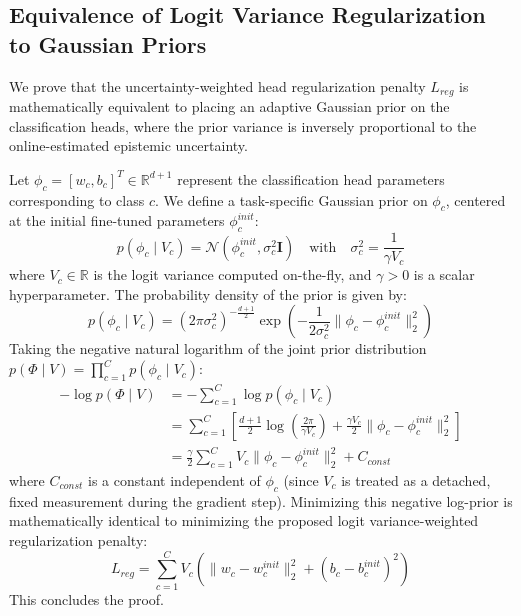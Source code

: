 \documentclass{article}
\theoremstyle{plain}
\theoremstyle{definition}
\theoremstyle{remark}
\begin{document}
\subsection{Equivalence of Logit Variance Regularization to Gaussian Priors}
We prove that the uncertainty-weighted head regularization penalty $L_{reg}$ is mathematically equivalent to placing an adaptive Gaussian prior on the classification heads, where the prior variance is inversely proportional to the online-estimated epistemic uncertainty.

Let $\phi_c = [w_c, b_c]^T \in \mathbb{R}^{d+1}$ represent the classification head parameters corresponding to class $c$. We define a task-specific Gaussian prior on $\phi_c$, centered at the initial fine-tuned parameters $\phi_c^{init}$:
\begin{equation}
  p(\phi_c \mid V_c) = \mathcal{N}\left( \phi_c^{init}, \sigma_c^2 \mathbf{I} \right) \quad \text{with} \quad \sigma_c^2 = \frac{1}{\gamma V_c}
\end{equation}
where $V_c \in \mathbb{R}$ is the logit variance computed on-the-fly, and $\gamma > 0$ is a scalar hyperparameter.
The probability density of the prior is given by:
\begin{equation}
  p(\phi_c \mid V_c) = \left( 2\pi \sigma_c^2 \right)^{-\frac{d+1}{2}} \exp\left( - \frac{1}{2\sigma_c^2} \| \phi_c - \phi_c^{init} \|_2^2 \right)
\end{equation}
Taking the negative natural logarithm of the joint prior distribution $p(\Phi \mid V) = \prod_{c=1}^C p(\phi_c \mid V_c)$:
\begin{align}
  -\log p(\Phi \mid V) &= -\sum_{c=1}^C \log p(\phi_c \mid V_c) \\
  &= \sum_{c=1}^C \left[ \frac{d+1}{2} \log\left(\frac{2\pi}{\gamma V_c}\right) + \frac{\gamma V_c}{2} \| \phi_c - \phi_c^{init} \|_2^2 \right] \\
  &= \frac{\gamma}{2} \sum_{c=1}^C V_c \| \phi_c - \phi_c^{init} \|_2^2 + C_{const}
\end{align}
where $C_{const}$ is a constant independent of $\phi_c$ (since $V_c$ is treated as a detached, fixed measurement during the gradient step). 
Minimizing this negative log-prior is mathematically identical to minimizing the proposed logit variance-weighted regularization penalty:
\begin{equation}
  L_{reg} = \sum_{c=1}^C V_c \left( \| w_c - w_c^{init} \|_2^2 + (b_c - b_c^{init})^2 \right)
\end{equation}
This concludes the proof.
\end{document}
